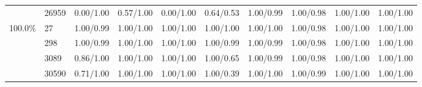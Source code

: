 \documentclass{bmcart}
\begin{document}
\begin{table}[htbp]
\begin{tabular}{rrrrrrrrrr}
    \multicolumn{1}{c}{} & \multicolumn{1}{l}{26959} & \multicolumn{1}{c}{0.00/1.00} & \multicolumn{1}{c}{0.57/1.00} & \multicolumn{1}{c}{0.00/1.00} & \multicolumn{1}{c}{0.64/0.53} & 1.00/0.99 & 1.00/0.98 & 1.00/1.00 & \multicolumn{1}{c}{1.00/1.00} \\
    \multicolumn{1}{c}{100.0\%} & \multicolumn{1}{l}{27} & \multicolumn{1}{c}{1.00/0.99} & \multicolumn{1}{c}{1.00/1.00} & \multicolumn{1}{c}{1.00/1.00} & \multicolumn{1}{c}{1.00/1.00} & 1.00/1.00 & 1.00/0.98 & 1.00/1.00 & \multicolumn{1}{c}{1.00/1.00} \\
    \multicolumn{1}{c}{} & \multicolumn{1}{l}{298} & \multicolumn{1}{c}{1.00/0.99} & \multicolumn{1}{c}{1.00/1.00} & \multicolumn{1}{c}{1.00/1.00} & \multicolumn{1}{c}{1.00/0.99} & 1.00/0.99 & 1.00/0.98 & 1.00/1.00 & \multicolumn{1}{c}{1.00/1.00} \\
    \multicolumn{1}{c}{} & \multicolumn{1}{l}{3089} & \multicolumn{1}{c}{0.86/1.00} & \multicolumn{1}{c}{1.00/1.00} & \multicolumn{1}{c}{1.00/1.00} & \multicolumn{1}{c}{1.00/0.65} & 1.00/0.99 & 1.00/0.98 & 1.00/1.00 & \multicolumn{1}{c}{1.00/1.00} \\
    \multicolumn{1}{c}{} & \multicolumn{1}{l}{30590} & \multicolumn{1}{c}{0.71/1.00} & \multicolumn{1}{c}{1.00/1.00} & \multicolumn{1}{c}{1.00/1.00} & \multicolumn{1}{c}{1.00/0.39} & 1.00/1.00 & 1.00/0.99 & 1.00/1.00 & \multicolumn{1}{c}{1.00/1.00} \\
    \bottomrule
    \end{tabular}%
\end{table}%
\end{document}
